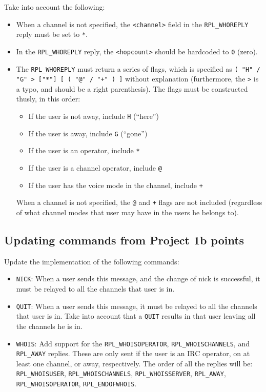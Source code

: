 \documentclass[10pt]{article}
\newcommand{\points}[1]{{\sffamily\mdseries\guillemotleft #1 points\guillemotright{}}}
\begin{document}
\noindent Take into account the following:

\begin{itemize}
\item When a channel is not specified, the \texttt{<channel>} field in the \texttt{RPL\_WHOREPLY} reply must be set to \texttt{*}.
\item In the \texttt{RPL\_WHOREPLY} reply, the \texttt{<hopcount>} should be hardcoded to \texttt{0} (zero).
\item The \texttt{RPL\_WHOREPLY} must return a series of flags, which is specified as \verb|( "H" / "G" > ["*"] [ ( "@" / "+" ) ]| without explanation (furthermore, the \texttt{>} is a typo, and should be a right parenthesis). The flags must be constructed thusly, in this order:
\begin{itemize}
\item If the user is not away, include \texttt{H} (``here'')
\item If the user is away, include \texttt{G} (``gone'')
\item If the user is an operator, include \texttt{*}
\item If the user is a channel operator, include \texttt{@}
\item If the user has the voice mode in the channel, include \texttt{+}
\end{itemize}
When a channel is not specified, the \texttt{@} and \texttt{+} flags are not included (regardless of what channel modes that user may have in the users he belongs to).
\end{itemize}

\subsection{Updating commands from Project 1b \points{5}}

Update the implementation of the following commands:

\begin{itemize}
\item \texttt{NICK}: When a user sends this message, and the change of nick is successful, it must be relayed to all the channels that user is in.
\item \texttt{QUIT}: When a user sends this message, it must be relayed to all the channels that user is in. Take into account that a \texttt{QUIT} results in that user leaving all the channels he is in.
\item \texttt{WHOIS}: Add support for the \texttt{RPL\_WHOISOPERATOR}, \texttt{RPL\_WHOISCHANNELS}, and \texttt{RPL\_AWAY} replies. These are only sent if the user is an IRC operator, on at least one channel, or away, respectively. The order of all the replies will be:  \texttt{RPL\_WHOISUSER}, \texttt{RPL\_WHOISCHANNELS}, \texttt{RPL\_WHOISSERVER}, \texttt{RPL\_AWAY}, \texttt{RPL\_WHOISOPERATOR}, \texttt{RPL\_ENDOFWHOIS}.
\end{itemize}
\end{document}
